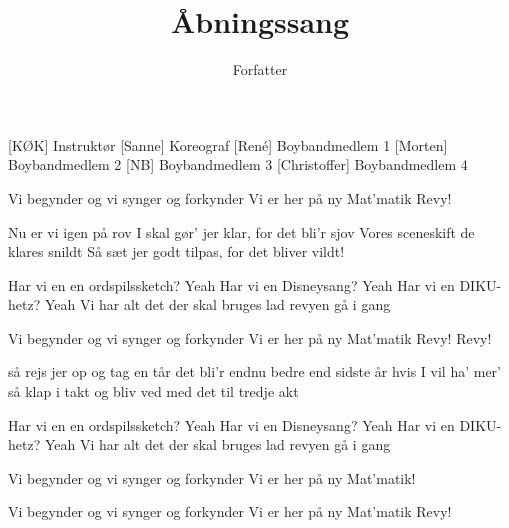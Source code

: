 \documentclass[a4paper,11pt]{article}
\title{Åbningssang}
\author{Forfatter}
\begin{document}
\maketitle

\begin{roles}
[KØK] Instruktør
[Sanne] Koreograf
[René] Boybandmedlem 1
[Morten] Boybandmedlem 2
[NB] Boybandmedlem 3
[Christoffer] Boybandmedlem 4
\end{roles}

\begin{song}
 Vi begynder
 og vi synger
 og forkynder
 Vi er her på ny
 Mat'matik Revy!

 Nu er vi igen på rov
I skal gør' jer klar, for det bli'r sjov
Vores sceneskift de klares snildt
Så sæt jer godt tilpas, for det bliver vildt!

 Har vi en en ordspilssketch? Yeah
Har vi en Disneysang? Yeah
Har vi en DIKU-hetz? Yeah
Vi har alt det der skal bruges lad revyen gå i gang

 Vi begynder
og vi synger
og forkynder
Vi er her på ny
Mat'matik Revy!
Revy!

 så rejs jer op og tag en tår
det bli'r endnu bedre end sidste år
hvis I vil ha' mer' så klap i takt
og bliv ved med det til tredje akt

 Har vi en en ordspilssketch? Yeah
Har vi en Disneysang? Yeah
Har vi en DIKU-hetz? Yeah
Vi har alt det der skal bruges lad revyen gå i gang

 Vi begynder
og vi synger
og forkynder
Vi er her på ny
Mat'matik!

 Vi begynder
og vi synger
og forkynder
Vi er her på ny
Mat'matik Revy!
\end{song}
\end{document}
